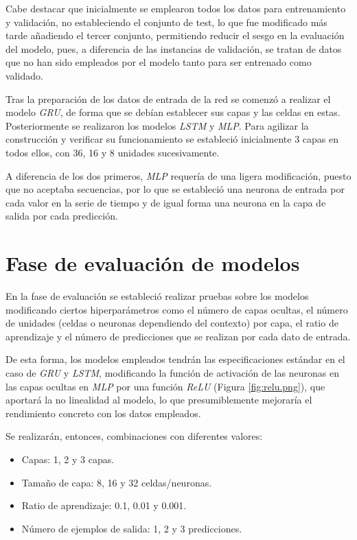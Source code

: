 
Cabe destacar que inicialmente se emplearon todos los datos para entrenamiento y validación, no estableciendo
el conjunto de test, lo que fue modificado más tarde añadiendo el tercer conjunto, permitiendo reducir el sesgo en 
la evaluación del modelo, pues, a diferencia de las instancias de validación, se tratan
de datos que no han sido empleados por el modelo tanto para ser entrenado como validado.

Tras la preparación de los datos de entrada de la red se comenzó a realizar el modelo \textit{GRU}, de forma
que se debían establecer sus capas y las celdas en estas. Posteriormente se realizaron los modelos
\textit{LSTM} y \textit{MLP}.
Para agilizar la construcción y verificar su funcionamiento se estableció inicialmente 3 capas en todos ellos, con
36, 16 y 8 unidades sucesivamente.

A diferencia de los dos primeros, \textit{MLP} requería de una ligera modificación, puesto que no aceptaba secuencias, 
por lo que se estableció una neurona de entrada por cada valor en la serie de tiempo y de igual forma una 
neurona en la capa de salida por cada predicción. 

\section{Fase de evaluación de modelos}
En la fase de evaluación se estableció realizar pruebas sobre los modelos modificando ciertos hiperparámetros como 
el número de capas ocultas, el número de unidades (celdas o neuronas dependiendo del contexto) por capa, el
ratio de aprendizaje y el número de predicciones que se realizan por cada dato de entrada.

De esta forma, los modelos empleados tendrán las especificaciones estándar en el caso de
\textit{GRU} y \textit{LSTM}, modificando la función de activación de las neuronas en las capas ocultas en 
\textit{MLP} por una función \textit{ReLU} (Figura \ref{fig:relu.png}), que aportará la no linealidad al modelo, lo que presumiblemente
mejoraría el rendimiento concreto con los datos empleados.


Se realizarán, entonces, combinaciones con diferentes valores:
\begin{itemize}
    \item Capas: 1, 2 y 3 capas.
    \item Tamaño de capa: 8, 16 y 32 celdas/neuronas.
    \item Ratio de aprendizaje: 0.1, 0.01 y 0.001.
    \item Número de ejemplos de salida: 1, 2 y 3 predicciones.
\end{itemize}

